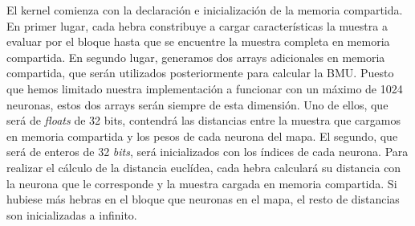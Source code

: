 El kernel comienza con la declaración e inicialización de la memoria compartida. En primer lugar, cada hebra constribuye a cargar características la muestra a evaluar por el bloque hasta que se encuentre la muestra completa en memoria compartida. En segundo lugar, generamos dos arrays adicionales en memoria compartida, que serán utilizados posteriormente para calcular la BMU. Puesto que hemos limitado nuestra implementación a funcionar con un máximo de 1024 neuronas, estos dos arrays serán siempre de esta dimensión. Uno de ellos, que será de \textit{floats} de 32 bits, contendrá las distancias entre la muestra que cargamos en memoria compartida y los pesos de cada neurona del mapa. El segundo, que será de enteros de 32 \textit{bits}, será inicializados con los índices de cada neurona. Para realizar el cálculo de la distancia euclídea, cada hebra calculará su distancia con la neurona que le corresponde y la muestra cargada en memoria compartida. Si hubiese más hebras en el bloque que neuronas en el mapa, el resto de distancias son inicializadas a infinito.\\

